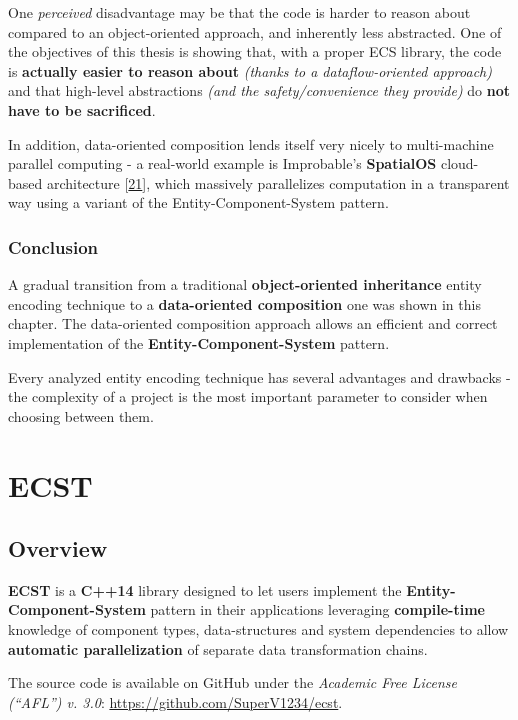 \documentclass[oneside, 12pt, a4paper, openany]{book}
\begin{document}
One \emph{perceived} disadvantage may be that the code is harder to
reason about compared to an object-oriented approach, and inherently
less abstracted. One of the objectives of this thesis is showing that,
with a proper ECS library, the code is \textbf{actually easier to reason
about} \emph{(thanks to a dataflow-oriented approach)} and that
high-level abstractions \emph{(and the safety/convenience they provide)}
do \textbf{not have to be sacrificed}.

In addition, data-oriented composition lends itself very nicely to
multi-machine parallel computing - a real-world example is Improbable's
\textbf{SpatialOS} cloud-based architecture
{[}\protect\hyperlink{ref-spatialos_learnmore}{21}{]}, which massively
parallelizes computation in a transparent way using a variant of the
Entity-Component-System pattern.

\section{Conclusion}\label{conclusion}

A gradual transition from a traditional \textbf{object-oriented
inheritance} entity encoding technique to a \textbf{data-oriented
composition} one was shown in this chapter. The data-oriented
composition approach allows an efficient and correct implementation of
the \textbf{Entity-Component-System} pattern.

Every analyzed entity encoding technique has several advantages and
drawbacks - the complexity of a project is the most important parameter
to consider when choosing between them.

\part{ECST}

\hypertarget{part2_ecst}{\chapter{Overview}\label{part2_ecst}}

\textbf{ECST} is a \textbf{C++14} library designed to let users
implement the \textbf{Entity-Component-System} pattern in their
applications leveraging \textbf{compile-time} knowledge of component
types, data-structures and system dependencies to allow
\textbf{automatic parallelization} of separate data transformation
chains.

The source code is available on GitHub under the \emph{Academic Free
License (``AFL'') v. 3.0}: \url{https://github.com/SuperV1234/ecst}.
\end{document}

